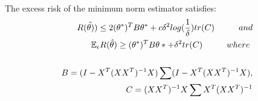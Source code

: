 \documentclass[a4paper,12pt]{scrartcl}
\theoremstyle{definition}
\begin{document}
\begin{thm}\ \\
The excess risk of the minimum norm estimator satisfies:
\begin{equation}
\begin{aligned}
R(\hat{\theta)}) \leq 2(\theta^*)^TB\theta^* + c\delta^2log(\frac{1}{\delta})tr(C) \hspace*{1cm}and \\
\mathbb{E}_\epsilon R(\hat{\theta}) \geq (\theta^*)^TB\theta* + \delta^2tr(C) \hspace*{1cm} where\ \\\\
\vspace*{0.5cm} B = (I - X^T(XX^T)^{-1}X)\sum(I - X^T(XX^T)^{-1}X),  \\
C = (XX^T)^{-1}X\sum X^T(XX^T)^{-1}
\end{aligned}
\end{equation} 

\end{thm}
\end{document}
